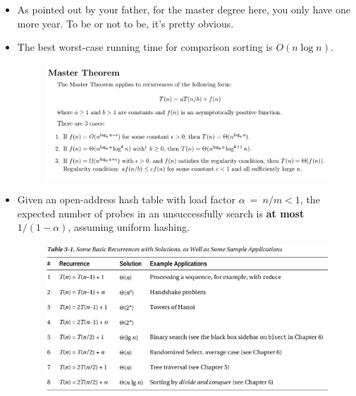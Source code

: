 \documentclass[twocolumn]{article}
\begin{document}
\begin{itemize}
\item As pointed out by your father, for the master degree here, you
  only have one more year. To be or not to be, it's pretty obvious.
\item The best worst-case running time for comparison sorting is
  $O(n\log n)$.
  \begin{figure}[!h]
    \centering
    \includegraphics[scale=0.2]{snapshot95}
  \end{figure}
\item Given an open-address hash table with load factor $\alpha~=~n/m
  < 1$, the expected number of probes in an unsuccessfully search is
  \textbf{at most} $1/(1-\alpha)$, assuming uniform hashing.
  \begin{figure}[!h]
    \centering
    \includegraphics[scale=0.2]{snapshot96}
  \end{figure}
\end{itemize}
\end{document}
